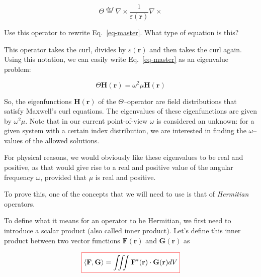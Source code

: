 \begin{equation}
\Theta \stackrel{def}{=} \nabla \times  \frac{1}{\varepsilon({\mathbf r})}\nabla \times
\end{equation} 

\begin{cue}
Use this operator to rewrite Eq.~\ref{eq-master}. What type of equation is this?   
\end{cue}

This operator takes the curl, divides by $\varepsilon({\mathbf r})$ and then takes the curl again. Using this notation, we can easily write Eq.~\ref{eq-master} as an eigenvalue problem:

\begin{equation}
\Theta {\mathbf H({\mathbf r})} = \omega^2 \mu {\mathbf H({\mathbf r})}
\end{equation} 

So, the eigenfunctions ${\mathbf H({\mathbf r})}$ of the $\Theta$--operator are field distributions that satisfy Maxwell's curl equations. The eigenvalues of these eigenfunctions are given by $\omega^2 \mu$. Note that in our current point-of-view $\omega$ is considered an unknown: for a given system with a certain index distribution, we are interested in finding the  $\omega$--values of the allowed solutions.

For physical reasons, we would obviously like these eigenvalues to be real and positive, as that would give rise to a real and positive value of the angular frequency $\omega$, provided that $\mu$ is real and positive.

To prove this, one of the concepts that we will need to use is that of \emph{Hermitian} operators.




\noindent{}To define what it means for an operator to be Hermitian, we first need to introduce a scalar product (also called inner product). Let's define this inner product between two vector functions ${\mathbf F({\mathbf r})}$ and ${\mathbf G({\mathbf r})}$ as

\begin{equation}
\fbox{$\displaystyle
\left\langle {\mathbf F}, {\mathbf G}\right\rangle = \iiint {\mathbf F^*({\mathbf r})} \cdot {\mathbf G({\mathbf r})} dV
$}
\end{equation} 

